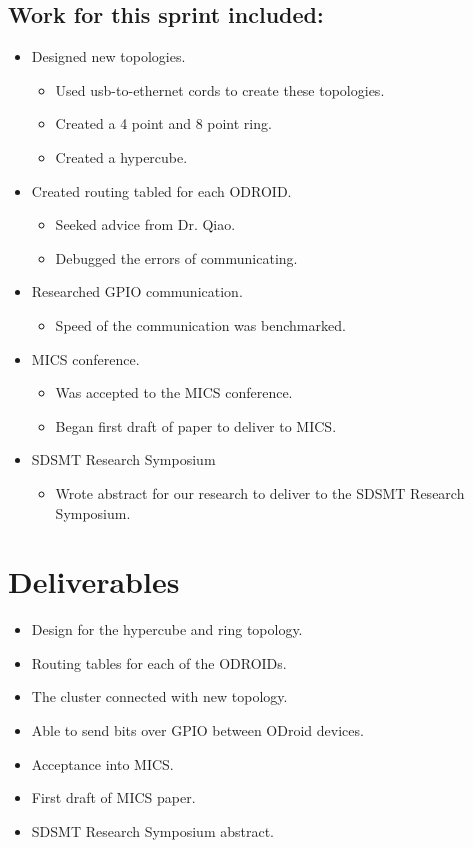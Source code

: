 \documentclass{article}
\begin{document}
\subsection*{Work for this sprint included:}
\begin{itemize}
	\item Designed new topologies.
	\begin{itemize}
		\item Used usb-to-ethernet cords to create these topologies.
		\item Created a 4 point and 8 point ring.
		\item Created a hypercube.
	\end{itemize}
	\item Created routing tabled for each ODROID.
	\begin{itemize}
		\item Seeked advice from Dr. Qiao.
		\item Debugged the errors of communicating.
	\end{itemize}
	\item Researched GPIO communication.
	\begin{itemize}
		\item Speed of the communication was benchmarked.
	\end{itemize} 
	\item MICS conference.
	\begin{itemize}
		\item Was accepted to the MICS conference.
		\item Began first draft of paper to deliver to MICS.
	\end{itemize}
	\item SDSMT Research Symposium
	\begin{itemize}
		\item Wrote abstract for our research to deliver to the SDSMT Research Symposium.
	\end{itemize}
\end{itemize}

\section*{Deliverables}
\begin{itemize}
	\item Design for the hypercube and ring topology.
	\item Routing tables for each of the ODROIDs.
	\item The cluster connected with new topology.
	\item Able to send bits over GPIO between ODroid devices.
	\item Acceptance into MICS.
	\item First draft of MICS paper.
	\item SDSMT Research Symposium abstract.
\end{itemize}
\end{document}
